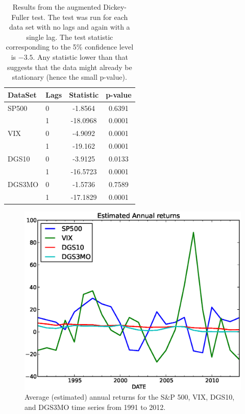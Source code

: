 \documentclass[a4paper, 11pt]{article}
\theoremstyle{definition} %
\numberwithin{equation}{section}
\begin{document}
      \begin{table}
        \begin{centering}
          \begin{tabular}{|l|l|cc|}
          \hline
            \rowcolor{gray!45} DataSet & Lags &  Statistic & p-value\\
            \hline
            \hline
            \rowcolor{gray!7} SP500 & 0 & -1.8564 & 0.6391\\
           \rowcolor{gray!23} {} & 1  & -18.0968 & 0.0001\\
            \rowcolor{gray!7} VIX & 0 & -4.9092 & 0.0001\\
           \rowcolor{gray!23} {} & 1  & -19.162 & 0.0001\\
            \rowcolor{gray!7} DGS10 & 0 & -3.9125 & 0.0133\\
            \rowcolor{gray!23} {} & 1 & -16.5723 & 0.0001\\
            \rowcolor{gray!7} DGS3MO & 0 & -1.5736 & 0.7589\\
            \rowcolor{gray!23} {} & 1 & -17.1829 & 0.0001\\
          \bottomrule
          \end{tabular}
          \captionsetup{width=5.5in}
          \caption{Results from the augmented Dickey-Fuller test. The test was run for each data set with no lags and again with a single lag. The test statistic corresponding to the 5\% confidence level is $ -3.5$. Any statistic lower than that suggests that the data might already be stationary (hence the small p-value).}
          \label{tab:dickeyfuller}
        \end{centering}
      \end{table}

      \begin{figure}[!h]
        \centering
        \includegraphics[width=6in]{./Figures/returns.eps}
        \captionsetup{width=5.5in}
        \caption{\small Average (estimated) annual returns for the S\&P 500, VIX, DGS10, and DGS3MO time series from 1991 to 2012.}
        \label{fig:returns}
      \end{figure}
\end{document}
